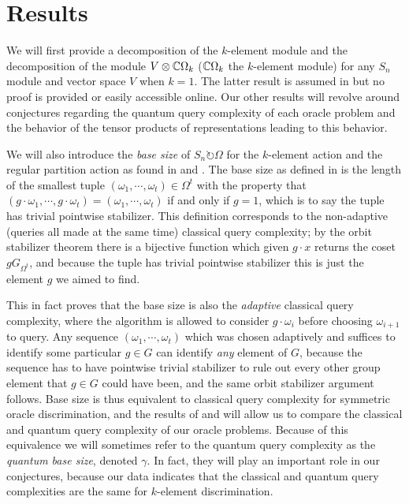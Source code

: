 \documentclass[12pt,twoside]{reedthesis}
\theoremstyle{plain}   %
\theoremstyle{definition}
\theoremstyle{remark}
\numberwithin{equation}{section}
\def\acts{\circlearrowright} %
\begin{document}
  \chapter{Results}
  We will first provide a decomposition of the $k$-element module and the decomposition of the module $V \otimes \mathbb{C} \Omega_k$ ($\mathbb{C} \Omega_k$ the $k$-element module) for any $S_n$ module and vector space $V$ when $k=1$.
  The latter result is assumed in \cite{copeland} but no proof is provided or easily accessible online.
  Our other results will revolve around conjectures regarding the quantum query complexity of each oracle problem and the behavior of the tensor products of representations leading to this behavior.
  \par
  We will also introduce the \emph{base size} of $S_n \acts \Omega$ for the $k$-element action and the regular partition action as found in \cite{spiga23} and \cite{morris21}.
  The base size as defined in \cite{copeland} is the length of the smallest tuple $(\omega_1, \cdots, \omega_t) \in \Omega^t$ with the property that $(g\cdot \omega_1, \cdots, g\cdot \omega_t) = (\omega_1, \cdots, \omega_t)$
  if and only if $g=1$, which is to say the tuple has trivial pointwise stabilizer.
  This definition corresponds to the non-adaptive (queries all made at the same time) classical query complexity; by the orbit stabilizer theorem there is a bijective function
  which given $g \cdot x$ returns the coset $gG_{\Omega^t}$, and because the tuple has trivial pointwise stabilizer this is just the element $g$ we aimed to find. \par
  This in fact proves that the base size is also the \emph{adaptive} classical query complexity, where the algorithm is allowed to consider $g \cdot \omega_i$ before choosing $\omega_{i+1}$ to query.
  Any sequence $(\omega_1, \cdots, \omega_t)$ which was chosen adaptively and suffices to identify some particular $g \in G$ can identify \emph{any} element of $G$, because the sequence has to have pointwise
  trivial stabilizer to rule out every other group element that $g \in G$ could have been, and the same orbit stabilizer argument follows. Base size is thus equivalent to classical query complexity for symmetric oracle discrimination,
  and the results of \cite{valle23} and \cite{morris21} will allow us to compare the classical and quantum query complexity of our oracle problems. Because of this equivalence we will sometimes refer to the quantum query complexity as the \emph{quantum base size}, denoted $\gamma$.
  In fact, they will play an important role in our conjectures, because our data indicates that the classical and quantum query complexities are the same for $k$-element discrimination.
\end{document}
